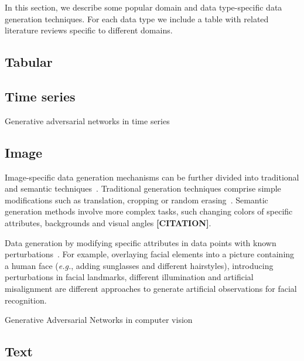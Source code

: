 \documentclass[parskip=full]{scrartcl}
\begin{document}
In this section, we describe some popular domain and data type-specific data
generation techniques. For each data type we include a table with related
literature reviews specific to different domains.

\subsection{Tabular}

\subsection{Time series}

Generative adversarial networks in time series 

\subsection{Image}

Image-specific data generation mechanisms can be further divided into
traditional and semantic techniques~\cite{wang2021regularizing}. Traditional
generation techniques comprise simple modifications such as translation,
cropping or random erasing~\cite{zhong2017random}. Semantic generation methods
involve more complex tasks, such changing colors of specific attributes,
backgrounds and visual angles \textbf{[CITATION]}. 

Data generation by modifying specific attributes in data points with known
perturbations~\cite{lv2017data}. For example, overlaying facial elements into
a picture containing a human face (\textit{e.g.}, adding sunglasses and
different hairstyles), introducing perturbations in facial landmarks,
different illumination and artificial misalignment are different approaches to
generate artificial observations for facial recognition.

Generative Adversarial Networks in computer vision~\cite{wang2021generative}


\subsection{Text}
\end{document}
